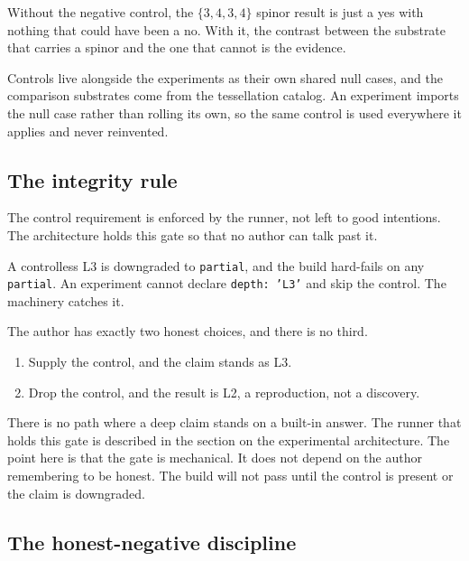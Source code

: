 \begin{result}
Without the negative control, the $\{3,4,3,4\}$ spinor result is just a yes with nothing that could have been a no. With it, the contrast between the substrate that carries a spinor and the one that cannot is the evidence.
\end{result}

Controls live alongside the experiments as their own shared null cases, and the comparison substrates come from the tessellation catalog. An experiment imports the null case rather than rolling its own, so the same control is used everywhere it applies and never reinvented.

\subsection{The integrity rule}

The control requirement is enforced by the runner, not left to good intentions. The architecture holds this gate so that no author can talk past it.

\begin{principle}
A controlless L3 is downgraded to \texttt{partial}, and the build hard-fails on any \texttt{partial}. An experiment cannot declare \texttt{depth: 'L3'} and skip the control. The machinery catches it.
\end{principle}

The author has exactly two honest choices, and there is no third.

\begin{enumerate}
\item Supply the control, and the claim stands as L3.
\item Drop the control, and the result is L2, a reproduction, not a discovery.
\end{enumerate}

There is no path where a deep claim stands on a built-in answer. The runner that holds this gate is described in the section on the experimental architecture. The point here is that the gate is mechanical. It does not depend on the author remembering to be honest. The build will not pass until the control is present or the claim is downgraded.

\subsection{The honest-negative discipline}

